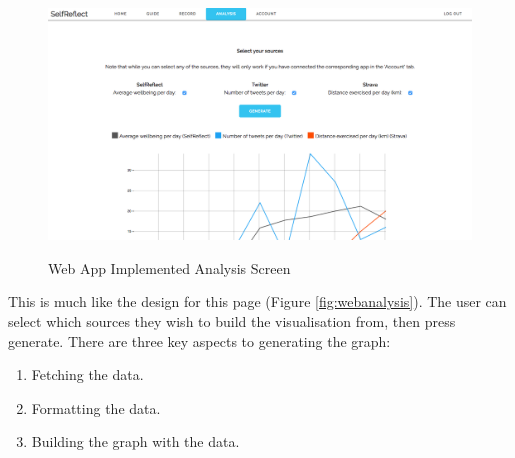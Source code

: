 \documentclass[11pt,openright,a4paper]{report}
\begin{document}
\begin{figure}[ht]
\centering
\caption{Web App Implemented Analysis Screen}
\includegraphics[width=\textwidth]{i/webanalysisimpl.png}
\label{fig:webanalysisimpl}
\end{figure}

This is much like the design for this page (Figure \ref{fig:webanalysis}). The user can select which sources they wish to build the visualisation from, then press generate. There are three key aspects to generating the graph:
\begin{enumerate}
\item Fetching the data.
\item Formatting the data.
\item Building the graph with the data.
\end{enumerate}
\end{document}
